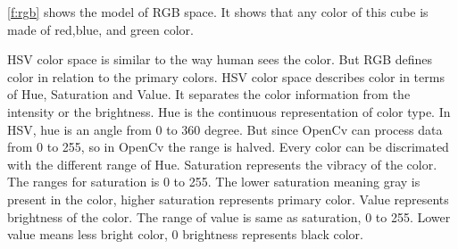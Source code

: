 \ref{f:rgb} shows the model of RGB space.
It shows that any color of this cube is made of red,blue, and green color.

HSV color space is similar to the way human sees the color.
But RGB defines color in relation to the primary colors.
HSV color space describes color in terms of Hue, Saturation and Value.
It separates the color information from the intensity or the brightness.
Hue is the continuous representation of color type.
In HSV, hue is an angle from 0 to 360 degree. 
But since OpenCv can process data from 0 to 255, so in OpenCv the range is halved.
Every color can be discrimated with the different range of Hue.
Saturation represents the vibracy of the color.
The ranges for saturation is 0 to 255.
The lower saturation meaning gray is present in the color, higher saturation represents primary color.
Value represents brightness of the color.
The range of value is same as saturation, 0 to 255.
Lower value means less bright color, 0 brightness represents black color.

